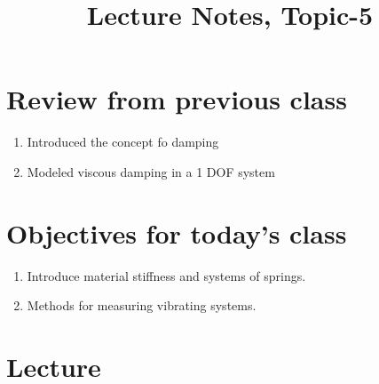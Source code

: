 \documentclass[12pt,a4paper]{article}
\begin{document}
	
	\large{}
	\title{\vspace{-2cm}Lecture Notes, Topic-5}
	\date{}
	\maketitle
	
	\section*{Review from previous class}
	\begin{enumerate}
		\item Introduced the concept fo damping
		\item Modeled viscous damping in a 1 DOF system
	\end{enumerate}
	
	\section*{Objectives for today's class}
	\begin{enumerate}
		\item Introduce material stiffness and systems of springs. 
		\item Methods for measuring vibrating systems.
	\end{enumerate}
	
	\section*{Lecture}
	
\end{document}
